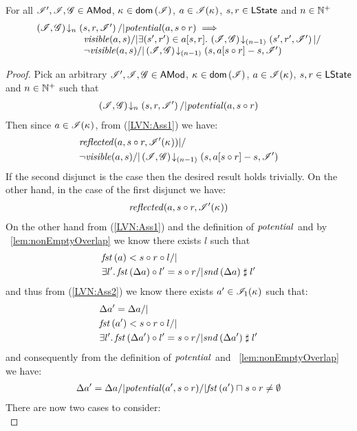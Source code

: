 \begin{lemma}[]\label{lem:action-em}
For all $\mathscr{I}', \mathscr{I}, \mathscr{G} \in \textsf{AMod}$,  $\kappa_{} \in \textsf{dom}\left( \mathscr{I} \right)$, $a \in \mathscr{I}(\kappa_{})$, $s, r \in \textsf{LState}$ and $n \in \mathbb{N}^{+}$
%
\[
\begin{array}{@{} l @{\hspace{-5cm}} l @{}} 
	\extendsAMUpto{\lmod, \gmod}{n}{s}{r}{\lmod'} /| \m{potential}(a, s \composeL r) \implies &\\
	& \m{visible}(a, s) /| \exsts{(s', r') \in a[s, r]} \extendsAMUpto{\lmod, \gmod}{(n-1)}{s'}{r'}{\lmod'} |/\\
	& \neg\m{visible}(a, s) /| \extendsAMUpto{\lmod, \gmod}{(n-1)}{s}{a[s \composeL r] - s}{\lmod'} 
\end{array}
\]
%
\begin{proof}
Pick an arbitrary $\mathscr{I}', \mathscr{I}, \mathscr{G} \in \textsf{AMod}$,  $\kappa_{} \in \textsf{dom}\left( \mathscr{I} \right)$, $a \in \mathscr{I}(\kappa_{})$, $s, r \in \textsf{LState}$ and $n \in \mathbb{N}^{+}$ such that
%
\begin{align}
	\left(\mathscr{I}, \mathscr{G}\right) \!\downarrow_{n} \left(s, r, \mathscr{I}'\right) /| \mathit{potential}(a, s \circ r) \label{LVN:Ass1}
\end{align}
Then since $a \in \mathscr{I}(\kappa_{})$, from (\ref{LVN:Ass1}) we have:
%
\begin{align*}
	& \mathit{reflected}(a, s \circ r, \mathscr{I}'(\kappa_{})) |/ \\
	& \neg\mathit{visible}(a, s) /| \left(\mathscr{I}, \mathscr{G}\right) \!\downarrow_{(n-1)} \left(s, a[s \circ r] - s, \mathscr{I}'\right) 
\end{align*}
%
If the second disjunct is the case then the desired result holds trivially. On the other hand, in the case of the first disjunct we have:
%
\begin{align}
	\mathit{reflected}(a, s \circ r, \mathscr{I}'(\kappa_{})) \label{LVN:Ass2}
\end{align}	
On the other hand from (\ref{LVN:Ass1}) and the definition of $\mathit{potential}$ and by \lem~\ref{lem:nonEmptyOverlap} we know there exists $l$ such that 
%
\begin{align*}
	& \fst{a} < s \composeL r \composeL l /| \null\\
	& \exsts{l'} \fst{\updateFP{a}} \composeL l' = s \composeL r /| \snd{\updateFP{a}} \compatible l'
\end{align*}
%
and thus from (\ref{LVN:Ass2}) we know there exists $a' \in \mathscr{I}_1(\kappa_{})$ such that: 
%
\begin{align*}
	& \updateFP{a'} = \updateFP{a} /|\\
	& \fst{a'} < s \composeL r \composeL l /| \null\\
	& \exsts{l'} \fst{\updateFP{a'}} \composeL l' = s \composeL r /| \snd{\updateFP{a'}} \compatible l'
\end{align*}
%
and consequently from the definition of $\mathit{potential}$ and \lem~\ref{lem:nonEmptyOverlap} we have: 
%
\begin{align}
	\Delta {a'} = \Delta {a} /| \mathit{potential}(a', s \circ r) /| \mathit{fst}\left(a'\right) \sqcap_{} s \circ r \not= \emptyset \label{LVN:Ass3}
\end{align}
There are now two cases to consider:\\


\end{proof}
\end{lemma}
